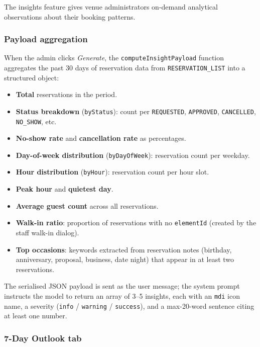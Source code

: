 \documentclass[12pt,a4paper,oneside]{report}
\begin{document}
The insights feature gives venue administrators on-demand analytical
observations about their booking patterns.

\subsubsection{Payload aggregation}

When the admin clicks \emph{Generate}, the \texttt{computeInsightPayload}
function aggregates the past 30 days of reservation data from
\texttt{RESERVATION\_LIST} into a structured object:

\begin{itemize}[leftmargin=1.5em, topsep=2pt, itemsep=2pt]
  \item \textbf{Total} reservations in the period.
  \item \textbf{Status breakdown} (\texttt{byStatus}): count per
        \texttt{REQUESTED}, \texttt{APPROVED}, \texttt{CANCELLED},
        \texttt{NO\_SHOW}, etc.
  \item \textbf{No-show rate} and \textbf{cancellation rate} as
        percentages.
  \item \textbf{Day-of-week distribution} (\texttt{byDayOfWeek}):
        reservation count per weekday.
  \item \textbf{Hour distribution} (\texttt{byHour}): reservation count
        per hour slot.
  \item \textbf{Peak hour} and \textbf{quietest day}.
  \item \textbf{Average guest count} across all reservations.
  \item \textbf{Walk-in ratio}: proportion of reservations with no
        \texttt{elementId} (created by the staff walk-in dialog).
  \item \textbf{Top occasions}: keywords extracted from reservation
        notes (birthday, anniversary, proposal, business, date night)
        that appear in at least two reservations.
\end{itemize}

The serialised JSON payload is sent as the user message; the system prompt
instructs the model to return an array of 3--5 insights, each with an
\texttt{mdi} icon name, a severity (\texttt{info} / \texttt{warning} /
\texttt{success}), and a max-20-word sentence citing at least one number.

\subsubsection{7-Day Outlook tab}
\end{document}

